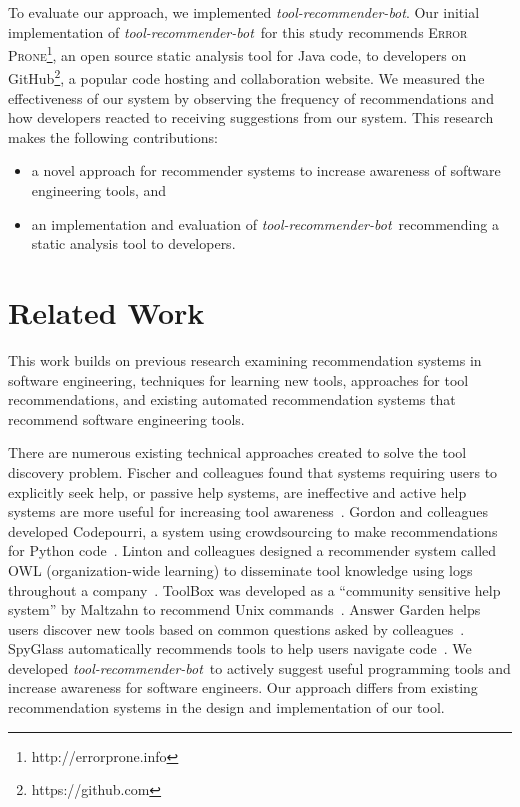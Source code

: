 \documentclass[sigconf,review,anonymous]{acmart}
\newcommand{\tool}{\textsl{tool-recommender-bot}}
\begin{document}

To evaluate our approach, we implemented \tool. Our initial implementation of \tool~for this study recommends \textsc{Error Prone}\footnote{http://errorprone.info}, an open source static analysis tool for Java code, to developers on GitHub\footnote{https://github.com}, a popular code hosting and collaboration website. We measured the effectiveness of our system by observing the frequency of recommendations and how developers reacted to receiving suggestions from our system. This research makes the following contributions:

\begin{itemize}
 \item a novel approach for recommender systems to increase awareness of software engineering tools, and
 \item an implementation and evaluation of \tool~recommending a static analysis tool to developers.
 \end{itemize}

\section{Related Work}
This work builds on previous research examining recommendation systems in software engineering, techniques for learning new tools, approaches for tool recommendations, and existing automated recommendation systems that recommend software engineering tools.

There are numerous existing technical approaches created to solve the tool discovery problem. Fischer and colleagues found that systems requiring users to explicitly seek help, or passive help systems, are ineffective and active help systems are more useful for increasing tool awareness~\cite{Fischer1984ActiveHelpSystems}. Gordon and colleagues developed Codepourri, a system using crowdsourcing to make recommendations for Python code~\cite{Gordon2015Codepourri}. Linton and colleagues designed a recommender system called OWL (organization-wide learning) to disseminate tool knowledge using logs throughout a company~\cite{Linton2000OWL}. ToolBox was developed as a ``community sensitive help system'' by Maltzahn to recommend Unix commands~\cite{Maltzahn1995Toolbox}. Answer Garden helps users discover new tools based on common questions asked by colleagues~\cite{Ackerman1990AnswerGarden}. SpyGlass automatically recommends tools to help users navigate code~\cite{Viriyakattiyaporn2010Spyglass}. We developed \tool~to actively suggest useful programming tools and increase awareness for software engineers. Our approach differs from existing recommendation systems in the design and implementation of our tool.
\end{document}

